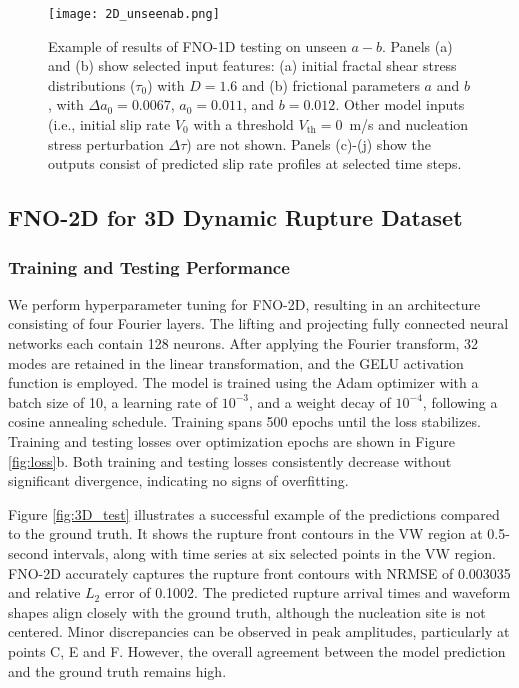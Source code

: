 \documentclass[draft]{agujournal2019}
\begin{document}
\begin{figure}
\centering
\texttt{[image: 2D\_unseenab.png]}
\caption{\label{fig:2D_unseen_ab}Example of results of FNO-1D testing on unseen $a-b$. Panels (a) and (b) show selected input features: (a) initial fractal shear stress distributions (\(\tau_{0}\)) with \(D = 1.6\) and (b) frictional parameters \(a\) and \(b\), with \(\Delta a_{0} = 0.0067\), \(a_{0} = 0.011\), and \(b = 0.012\). Other model inputs (i.e., initial slip rate \(V_0\) with a threshold \(V_\text{th} = 0\)~m/s and nucleation stress perturbation \(\Delta \tau\)) are not shown. Panels (c)-(j) show the outputs consist of predicted slip rate profiles at selected time steps.
}
\end{figure}

\subsection{FNO-2D for 3D Dynamic Rupture Dataset}
\label{sec:FNO-2D}

\subsubsection{Training and Testing Performance}
\label{sec:FNO-2D_training}

We perform hyperparameter tuning for FNO-2D, resulting in an architecture consisting of four Fourier layers. The lifting and projecting fully connected neural networks each contain 128 neurons. After applying the Fourier transform, 32 modes are retained in the linear transformation, and the GELU activation function is employed. The model is trained using the Adam optimizer with a batch size of 10, a learning rate of \(10^{-3}\), and a weight decay of \(10^{-4}\), following a cosine annealing schedule. Training spans 500 epochs until the loss stabilizes. Training and testing losses over optimization epochs are shown in Figure \ref{fig:loss}b. Both training and testing losses consistently decrease without significant divergence, indicating no signs of overfitting. 

Figure \ref{fig:3D_test} illustrates a successful example of the predictions compared to the ground truth. It shows the rupture front contours in the VW region at 0.5-second intervals, along with time series at six selected points in the VW region. FNO-2D accurately captures the rupture front contours with NRMSE of 0.003035 and relative \(L_2\) error of 0.1002. The predicted rupture arrival times and waveform shapes align closely with the ground truth, although the nucleation site is not centered. Minor discrepancies can be observed in peak amplitudes, particularly at points C, E and F. However, the overall agreement between the model prediction and the ground truth remains high. 
\end{document}
